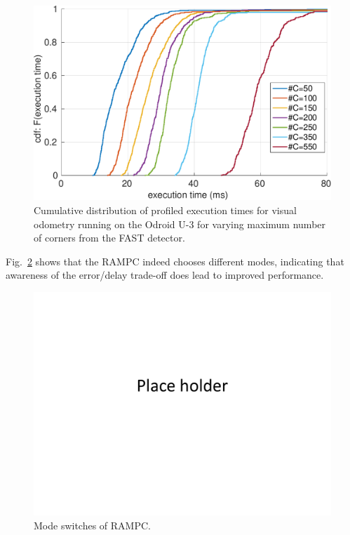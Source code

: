 \begin{figure}[htbp]
  \centering
  \includegraphics[width=0.9\columnwidth]{figures/time_ecdf_millisec.pdf}
  \caption{Cumulative distribution of profiled execution times for visual odometry running on the Odroid U-3 for varying maximum number of corners from the FAST detector.}
  \label{fig:time_ecdf}
\end{figure}

Fig.~\ref{fig:modeSwitching} shows that the RAMPC indeed chooses different modes, indicating that awareness of the error/delay trade-off does lead to improved performance.
\begin{figure}[t]
	\centering
	\includegraphics[width=0.9\columnwidth]{figures/placeHolder}
	\caption{Mode switches of RAMPC.}
	\label{fig:modeSwitching}
\end{figure}






